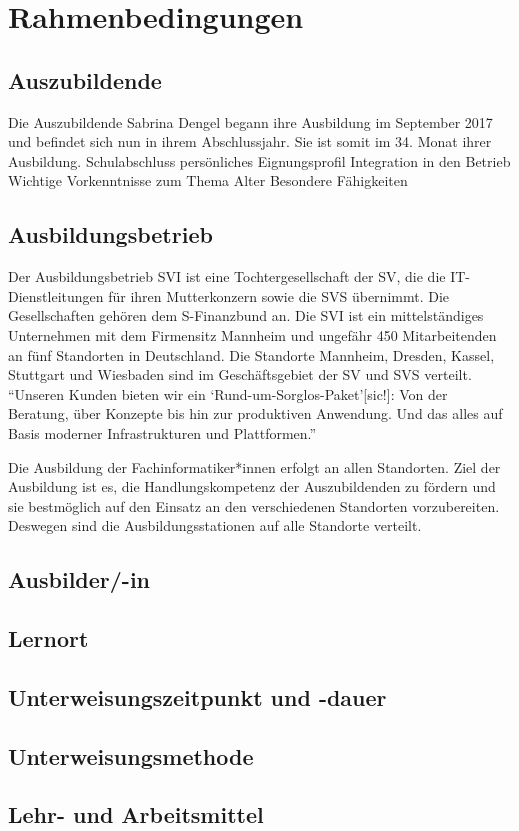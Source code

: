 \chapter{Rahmenbedingungen}

\section{Auszubildende}
Die Auszubildende Sabrina Dengel begann ihre Ausbildung im September 2017 und befindet sich nun in ihrem Abschlussjahr. Sie ist somit im 34. Monat ihrer Ausbildung. 
Schulabschluss
persönliches Eignungsprofil
Integration in den Betrieb 
Wichtige Vorkenntnisse zum Thema
Alter 
Besondere Fähigkeiten 

\section{Ausbildungsbetrieb}
Der Ausbildungsbetrieb \ac{SVI} ist eine Tochtergesellschaft der \ac{SV}, die die IT-Dienstleitungen für ihren Mutterkonzern sowie die \ac{SVS} übernimmt. Die Gesellschaften gehören dem S-Finanzbund an. Die \ac{SVI} ist ein mittelständiges Unternehmen mit dem Firmensitz Mannheim und ungefähr 450 Mitarbeitenden\autocite[vgl.][]{sv_informatik_gmbg_uber_2020} an fünf Standorten in Deutschland. Die Standorte Mannheim, Dresden, Kassel, Stuttgart und Wiesbaden sind im Geschäftsgebiet der \ac{SV} und \ac{SVS} verteilt. \enquote{Unseren Kunden bieten wir ein \enquote{Rund-um-Sorglos-Paket}[sic!]: Von der Beratung, über Konzepte bis hin zur produktiven Anwendung. Und das alles auf Basis moderner Infrastrukturen und Plattformen.}\autocite{sv_informatik_gmbg_uber_2020}
\par
Die Ausbildung der Fachinformatiker*innen erfolgt an allen Standorten. Ziel der Ausbildung ist es, die Handlungskompetenz der Auszubildenden zu fördern und sie bestmöglich auf den Einsatz an den verschiedenen Standorten vorzubereiten. Deswegen sind die Ausbildungsstationen auf alle Standorte verteilt.

\section{Ausbilder/-in}

\section{Lernort}

\section{Unterweisungszeitpunkt und -dauer}

\section{Unterweisungsmethode}

\section{Lehr- und Arbeitsmittel}


